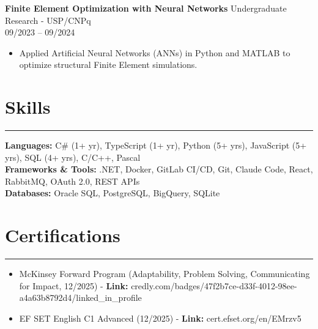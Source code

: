 \documentclass[10pt,a4paper]{article}
\begin{document}
\vspace{1mm}
\textbf{Finite Element Optimization with Neural Networks} \hfill Undergraduate Research - USP/CNPq \\
\textit{} \hfill 09/2023 -- 09/2024
\begin{itemize}[nosep]
    \item Applied Artificial Neural Networks (ANNs) in Python and MATLAB to optimize structural Finite Element simulations.
\end{itemize}

\section*{Skills}
\hrule \vspace{2mm}
\textbf{Languages:} C\# (1+ yr), TypeScript (1+ yr), Python (5+ yrs), JavaScript (5+ yrs), SQL (4+ yrs), C/C++, Pascal \\
\textbf{Frameworks \& Tools:} .NET, Docker, GitLab CI/CD, Git, Claude Code, React, RabbitMQ, OAuth 2.0, REST APIs \\
\textbf{Databases:} Oracle SQL, PostgreSQL, BigQuery, SQLite

\section*{Certifications}
\hrule \vspace{2mm}
\begin{itemize}[nosep]
    \item McKinsey Forward Program (Adaptability, Problem Solving, Communicating for Impact, 12/2025) - \textbf{Link:} credly.com/badges/47f2b7ce-d33f-4012-98ee-a4a63b8792d4/linked\_in\_profile
    \item EF SET English C1 Advanced (12/2025) - \textbf{Link:} cert.efset.org/en/EMrzv5
\end{itemize}
\end{document}
